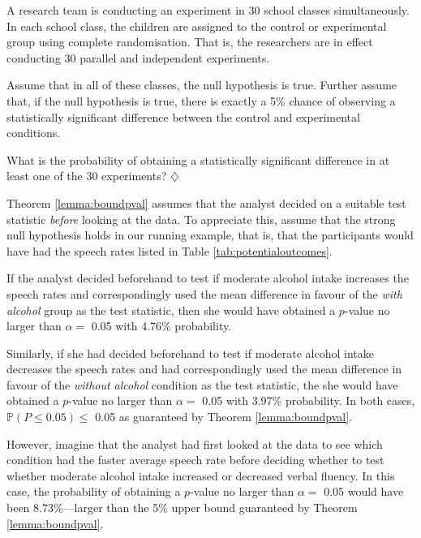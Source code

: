 \documentclass[a4paper]{tufte-book}\usepackage[]{graphicx}\usepackage[]{xcolor}
\newcommand*{\parend}[1][$\diamondsuit$]{%
  \unskip\nobreak\hspace{1em plus 1fill}$\diamondsuit$%
}
\begin{document}
\label{ex:multipletesting}
A research team is conducting an experiment in 30 school classes
        simultaneously. In each school class, the children are assigned
        to the control or experimental group using complete randomisation.
        That is, the researchers are in effect conducting 30 parallel and
        independent experiments.

        Assume that in all of these classes, the null hypothesis is true.
        Further assume that, if the null hypothesis is true, there is
        exactly a 5\% chance of observing a statistically significant difference between
        the control and experimental conditions.

        What is the probability of obtaining a statistically significant
        difference in at least one of the 30 experiments?
\parend

\label{ex:flexibletesting}
  Theorem \ref{lemma:boundpval} assumes that the analyst decided 
  on a suitable test statistic \emph{before} looking at the data.
  To appreciate this, assume that the strong null hypothesis holds 
  in our running example, that is, that the participants would have had
  the speech rates listed in Table \ref{tab:potentialoutcomes}.
  
  If the analyst decided beforehand to test if moderate alcohol intake
  increases the speech rates and correspondingly used the mean difference
  in favour of the \textit{with alcohol} group as the test statistic,
  then she would have obtained a $p$-value no larger than $\alpha =$ 0.05
  with 4.76\% probability.
  
  Similarly, if she had decided beforehand to test if moderate alcohol intake
  decreases the speech rates and had correspondingly used the mean difference
  in favour of the \textit{without alcohol} condition as the test statistic,
  the she would have obtained a $p$-value no larger than $\alpha =$ 0.05
  with 3.97\% probability.
  In both cases, $\mathbb{P}(P \leq 0.05) \leq$ 0.05 as guaranteed by 
  Theorem \ref{lemma:boundpval}.
  
  However, imagine that the analyst had first looked at the data to see
  which condition had the faster average speech rate before deciding
  whether to test whether moderate alcohol intake increased or decreased verbal
  fluency.
  In this case, the probability of obtaining a $p$-value no larger than $\alpha =$ 0.05
  would have been 8.73\%---larger than the 5\% upper bound guaranteed by
  Theorem \ref{lemma:boundpval}.
  
\end{document}
